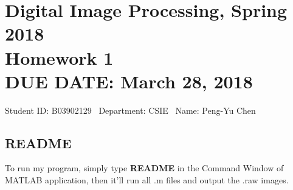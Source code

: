 \documentclass{article}
\newcommand{\hmwkClass}{Digital Image Processing, Spring 2018}
\newcommand{\hmwkTitle}{Homework 1}
\newcommand{\hmwkDueDate}{March 28, 2018}
\newcommand{\tb}{\textbf}
\begin{document}
\thispagestyle{empty}
\section*{\hmwkClass \\
    \normalsize{\hmwkTitle} \\
    \normalsize{DUE DATE: \hmwkDueDate}
}

\hfill{Student ID: B03902129 \, Department: CSIE \, Name: Peng-Yu Chen}

\subsection*{README}

To run my program, simply type \tb{README} in the Command Window of MATLAB application, then it'll run all .m files and output the .raw images.
\end{document}
